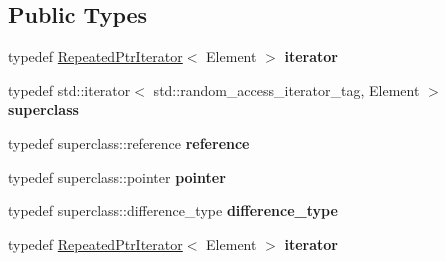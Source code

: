 \subsection*{Public Types}
\begin{DoxyCompactItemize}
\item 
\mbox{\label{classgoogle_1_1protobuf_1_1internal_1_1RepeatedPtrIterator_ab47f8f8a265af8e42ad04edc69ff8289}} 
typedef \hyperlink{classgoogle_1_1protobuf_1_1internal_1_1RepeatedPtrIterator}{Repeated\+Ptr\+Iterator}$<$ Element $>$ {\bfseries iterator}
\item 
\mbox{\label{classgoogle_1_1protobuf_1_1internal_1_1RepeatedPtrIterator_ad2f1ee259970c422b2c9aeb8160345c6}} 
typedef std\+::iterator$<$ std\+::random\+\_\+access\+\_\+iterator\+\_\+tag, Element $>$ {\bfseries superclass}
\item 
\mbox{\label{classgoogle_1_1protobuf_1_1internal_1_1RepeatedPtrIterator_acbb8d7e32d1d385d32ba3fbc417746b3}} 
typedef superclass\+::reference {\bfseries reference}
\item 
\mbox{\label{classgoogle_1_1protobuf_1_1internal_1_1RepeatedPtrIterator_a95c80fe631fa6cc3314e0551a729ab26}} 
typedef superclass\+::pointer {\bfseries pointer}
\item 
\mbox{\label{classgoogle_1_1protobuf_1_1internal_1_1RepeatedPtrIterator_adeff8e942f0b76e7effa0c2c96bdbd2c}} 
typedef superclass\+::difference\+\_\+type {\bfseries difference\+\_\+type}
\item 
\mbox{\label{classgoogle_1_1protobuf_1_1internal_1_1RepeatedPtrIterator_ab47f8f8a265af8e42ad04edc69ff8289}} 
typedef \hyperlink{classgoogle_1_1protobuf_1_1internal_1_1RepeatedPtrIterator}{Repeated\+Ptr\+Iterator}$<$ Element $>$ {\bfseries iterator}
\item 
\mbox{\label{classgoogle_1_1protobuf_1_1internal_1_1RepeatedPtrIterator_ad2f1ee259970c422b2c9aeb8160345c6}} 

\end{DoxyCompactItemize}
